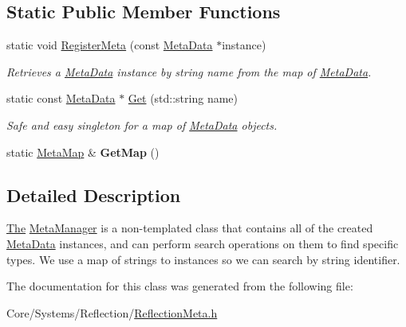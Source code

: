 \subsection*{Static Public Member Functions}
\begin{DoxyCompactItemize}
\item 
\hypertarget{classDCEngine_1_1MetaManager_ac6471165d47b8f56cd25e40352496fe2}{static void \hyperlink{classDCEngine_1_1MetaManager_ac6471165d47b8f56cd25e40352496fe2}{Register\-Meta} (const \hyperlink{classDCEngine_1_1MetaData}{Meta\-Data} $\ast$instance)}\label{classDCEngine_1_1MetaManager_ac6471165d47b8f56cd25e40352496fe2}

\begin{DoxyCompactList}\small\item\em Retrieves a \hyperlink{classDCEngine_1_1MetaData}{Meta\-Data} instance by string name from the map of \hyperlink{classDCEngine_1_1MetaData}{Meta\-Data}. \end{DoxyCompactList}\item 
\hypertarget{classDCEngine_1_1MetaManager_a1898766bbb3ad85503a584621c9f1464}{static const \hyperlink{classDCEngine_1_1MetaData}{Meta\-Data} $\ast$ \hyperlink{classDCEngine_1_1MetaManager_a1898766bbb3ad85503a584621c9f1464}{Get} (std\-::string name)}\label{classDCEngine_1_1MetaManager_a1898766bbb3ad85503a584621c9f1464}

\begin{DoxyCompactList}\small\item\em Safe and easy singleton for a map of \hyperlink{classDCEngine_1_1MetaData}{Meta\-Data} objects. \end{DoxyCompactList}\item 
\hypertarget{classDCEngine_1_1MetaManager_adf668b5808bd3491d3c8b360f0bb73ac}{static \hyperlink{classDCEngine_1_1MetaManager_a562b47d9f1618a39fdb9130688823dbd}{Meta\-Map} \& {\bfseries Get\-Map} ()}\label{classDCEngine_1_1MetaManager_adf668b5808bd3491d3c8b360f0bb73ac}

\end{DoxyCompactItemize}


\subsection{Detailed Description}
\hyperlink{classThe}{The} \hyperlink{classDCEngine_1_1MetaManager}{Meta\-Manager} is a non-\/templated class that contains all of the created \hyperlink{classDCEngine_1_1MetaData}{Meta\-Data} instances, and can perform search operations on them to find specific types. We use a map of strings to instances so we can search by string identifier. 

The documentation for this class was generated from the following file\-:\begin{DoxyCompactItemize}
\item 
Core/\-Systems/\-Reflection/\hyperlink{ReflectionMeta_8h}{Reflection\-Meta.\-h}\end{DoxyCompactItemize}
